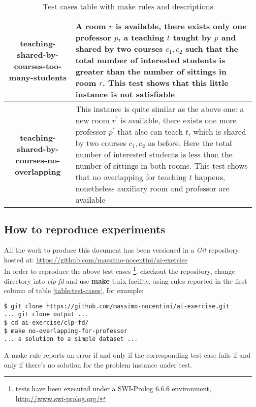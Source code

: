 \documentclass[10pt,a4paper]{article} %
\begin{document}
\begin{table}
\begin{tabular}{ c | p{6cm} }
            \hline
            \textbf{teaching-shared-by-courses-too-many-students} &
                A room $r$ is available,
                there exists only one professor $p$, a teaching $t$ taught by $p$
                and shared by two courses $c_1, c_2$ such that the total number
                of interested students is greater than the number of sittings in
                room $r$.
                This test shows that this little instance is not satisfiable \\
            \hline
            \textbf{teaching-shared-by-courses-no-overlapping} &
                This instance is quite similar as the above one: a new
                room $r^\prime$ is available, there exists one more professor
                $p^\prime$ that also can teach $t$, which is shared by two
                courses $c_1, c_2$ as before. Here the total number
                of interested students is less than the number of sittings in
                both rooms. This test shows that no overlapping for teaching $t$
                happens, nonetheless auxiliary room and professor are available \\
            \end{tabular}

        \caption{Test cases table with make rules and descriptions}
        \label{table:test-cases}

    \end{table}

    \subsection{How to reproduce experiments}
    All the work to produce this document has been versioned in a
    \emph{Git} repository hosted at:
    \url{https://github.com/massimo-nocentini/ai-exercise}\\
    In order to reproduce the above test cases \footnote{tests have been
        executed under a SWI-Prolog 6.6.6 environment,
        \url{http://www.swi-prolog.org/}}, checkout the
    repository, change directory into \emph{clp-fd} and use \textbf{make}
    Unix facility, using rules reported in the first column of table
    \autoref{table:test-cases}, for example:
    \begin{verbatim}
$ git clone https://github.com/massimo-nocentini/ai-exercise.git
... git clone output ...
$ cd ai-exercise/clp-fd/
$ make no-overlapping-for-professor
... a solution to a simple dataset ...
    \end{verbatim}
    A make rule reports an error if and only if the corresponding
    test case fails if and only if there's no solution for the
    problem instance under test.
\end{document}
